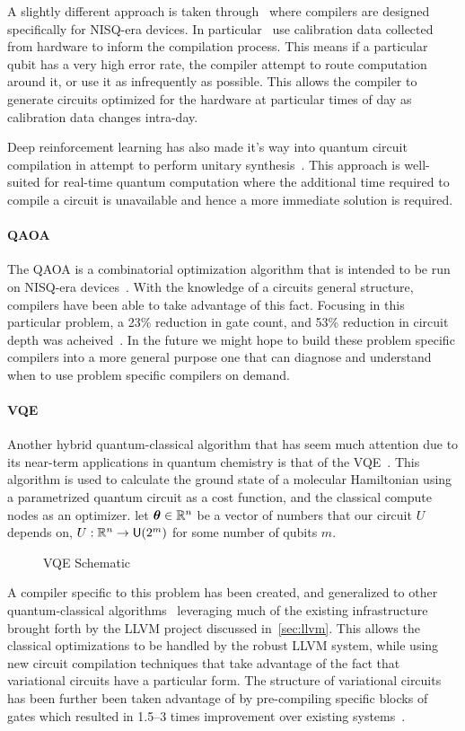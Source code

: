 A slightly different approach is taken through~\cite{nisq-comp,nisq-comp2,nisq-comp3} where compilers are designed specifically for \ac{NISQ}-era devices.
In particular~\cite{nisq-comp2,nisq-comp3} use calibration data collected from hardware to inform the compilation process.
This means if a particular qubit has a very high error rate, the compiler attempt to route computation around it, or use it as infrequently as possible.
This allows the compiler to generate circuits optimized for the hardware at particular times of day as calibration data changes intra-day.

Deep reinforcement learning has also made it's way into quantum circuit compilation in attempt to perform unitary synthesis~\cite{deepcompile}.
This approach is well-suited for real-time quantum computation where the additional time required to compile a circuit is unavailable and hence a more immediate solution is required.

\paragraph{QAOA}
The \ac{QAOA} is a combinatorial optimization algorithm that is intended to be run on \ac{NISQ}-era devices~\cite{qaoa}.
With the knowledge of a circuits general structure, compilers have been able to take advantage of this fact.
Focusing in this particular problem, a 23\% reduction in gate count, and 53\% reduction in circuit depth was acheived~\cite{qaoa-compiler}.
In the future we might hope to build these problem specific compilers into a more general purpose one that can diagnose and understand when to use problem specific compilers on demand.

\paragraph{VQE}
Another hybrid quantum-classical algorithm that has seem much attention due to its near-term applications in quantum chemistry is that of the \ac{VQE}~\cite{vqe,vqe2}.
This algorithm is used to calculate the ground state of a molecular Hamiltonian using a parametrized quantum circuit as a cost function, and the classical compute nodes as an optimizer.
\Eg{} let $\boldsymbol{\theta} \in \mathbb{R}^n$ be a vector of numbers that our circuit $U$ depends on, \ie{} $U: \mathbb{R}^n \to \mathsf{U} (2^m)$ for some number of qubits $m$.
\begin{figure}[ht] %
    \centering
    
    \caption{\acs{VQE} Schematic}\label{fig:vqe}
\end{figure}
A compiler specific to this problem has been created, and generalized to other quantum-classical algorithms~\cite{vqe-compiler} leveraging much of the existing infrastructure brought forth by the LLVM project discussed in~\cref{sec:llvm}.
This allows the classical optimizations to be handled by the robust LLVM system, while using new circuit compilation techniques that take advantage of the fact that variational circuits have a particular form.
The structure of variational circuits has been further been taken advantage of by pre-compiling specific blocks of gates which resulted in 1.5--3 times improvement over existing systems~\cite{vqe-partial}.


